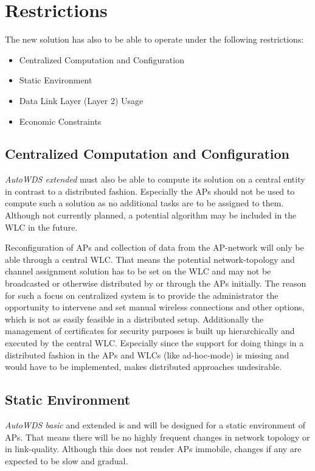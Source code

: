   \section{Restrictions}
    The new solution has also to be able to operate under the following restrictions:
    \begin{itemize}
     \item Centralized Computation and Configuration
     \item Static Environment
     \item Data Link Layer (Layer 2) Usage
     \item Economic Constraints
    \end{itemize}
    
    \subsection{Centralized Computation and Configuration}
      \textit{AutoWDS extended} must also be able to compute its solution on a central entity in contrast to a distributed fashion.
      Especially the APs should not be used to compute such a solution as no additional tasks are to be assigned to them.
      Although not currently planned, a potential algorithm may be included in the \ac{WLC} in the future.
      
      Reconfiguration of APs and collection of data from the \ac{AP}-network will only be able through a central \ac{WLC}.
      That means the potential network-topology and channel assignment solution has to be set on the \ac{WLC} and may not be broadcasted or otherwise
      distributed by or through the APs initially. The reason for such a focus on centralized system is to provide the administrator the 
      opportunity to intervene and set manual wireless connections and other options, which is not as easily feasible in a distributed setup. 
      Additionally the management of certificates for security purposes is built up hierarchically and executed by the central \ac{WLC}.
      Especially since the support for doing things in a distributed fashion in the APs and WLCs (like ad-hoc-mode) is missing and would have to be implemented, 
      makes distributed approaches undesirable.
      
    \subsection{Static Environment}
      \textit{AutoWDS basic} and extended is and will be designed for a static environment of APs. That means there will be no highly frequent changes in
      network topology or in link-quality. Although this does not render APs immobile, changes if any are expected to be slow and gradual.
      
